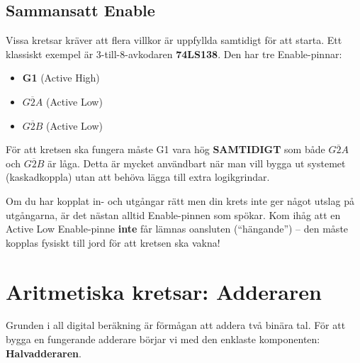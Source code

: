 \documentclass[
  swedish,
  letterpaper,
  oneside,
  openany]{book}
\providecommand{\tightlist}{%
  \setlength{\itemsep}{0pt}\setlength{\parskip}{0pt}}
\begin{document}
\subsection{Sammansatt Enable}\label{sammansatt-enable}

Vissa kretsar kräver att flera villkor är uppfyllda samtidigt för att
starta. Ett klassiskt exempel är 3-till-8-avkodaren \textbf{74LS138}.
Den har tre Enable-pinnar:

\begin{itemize}
\tightlist
\item
  \textbf{G1} (Active High)
\item
  \textbf{\(\overline{G2A}\)} (Active Low)
\item
  \textbf{\(\overline{G2B}\)} (Active Low)
\end{itemize}

För att kretsen ska fungera måste G1 vara hög \textbf{SAMTIDIGT} som
både \(\overline{G2A}\) och \(\overline{G2B}\) är låga. Detta är mycket
användbart när man vill bygga ut systemet (kaskadkoppla) utan att behöva
lägga till extra logikgrindar.

\begin{tcolorbox}[enhanced jigsaw, arc=.35mm, bottomrule=.15mm, bottomtitle=1mm, breakable, colback=white, colbacktitle=quarto-callout-important-color!10!white, colframe=quarto-callout-important-color-frame, coltitle=black, left=2mm, leftrule=.75mm, opacityback=0, opacitybacktitle=0.6, rightrule=.15mm, title=\textcolor{quarto-callout-important-color}{\faExclamation}\hspace{0.5em}{Tips från labbet: ``Död'' krets?}, titlerule=0mm, toprule=.15mm, toptitle=1mm]

Om du har kopplat in- och utgångar rätt men din krets inte ger något
utslag på utgångarna, är det nästan alltid Enable-pinnen som spökar. Kom
ihåg att en Active Low Enable-pinne \textbf{inte} får lämnas oansluten
(``hängande'') -- den måste kopplas fysiskt till jord för att kretsen
ska vakna!

\end{tcolorbox}

\section{Aritmetiska kretsar: Adderaren}\label{sec-adderaren}

Grunden i all digital beräkning är förmågan att addera två binära tal.
För att bygga en fungerande adderare börjar vi med den enklaste
komponenten: \textbf{Halvadderaren}.
\end{document}
